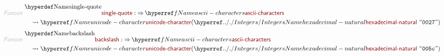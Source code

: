 \begin{align*}
  \KEY{Funcon} ~ 
  & \NAMEDECL{single-quote} :  \TO \NAMEREF{ascii-characters} \\
  & \quad \leadsto \NAMEREF{unicode-character}
                     ( \NAMEHYPER{../.}{Integers}{hexadecimal-natural} ~
                         \STRING{0027} )
\end{align*}
\begin{align*}
  \KEY{Funcon} ~ 
  & \NAMEDECL{backslash} :  \TO \NAMEREF{ascii-characters} \\
  & \quad \leadsto \NAMEREF{unicode-character}
                     ( \NAMEHYPER{../.}{Integers}{hexadecimal-natural} ~
                         \STRING{005c} )
\end{align*}
